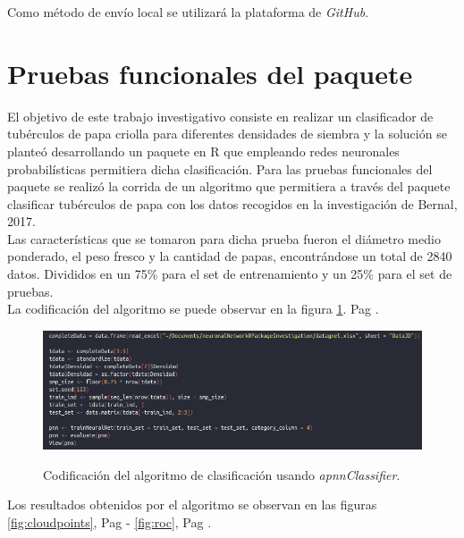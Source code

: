 	Como método de envío local se utilizará la plataforma de \textit{GitHub}.\\
	
\section{Pruebas funcionales del paquete}

	El objetivo de este trabajo investigativo consiste en realizar un clasificador de tubérculos de papa criolla para diferentes densidades de siembra y la solución se planteó desarrollando un paquete en R que empleando redes neuronales probabilísticas permitiera dicha clasificación. Para las pruebas funcionales del paquete se realizó la corrida de un algoritmo que permitiera a través del paquete clasificar tubérculos de papa con los datos recogidos en la investigación de Bernal, 2017. \\

	Las características que se tomaron para dicha prueba fueron el diámetro medio ponderado, el peso fresco y la cantidad de papas, encontrándose un total de 2840 datos. Divididos en un 75\% para el set de entrenamiento y un 25\% para el set de pruebas.\\

La codificación del algoritmo se puede observar en la figura \ref{fig:packageuse}. Pag \pageref{fig:packageuse}. \\

\begin{figure}[h]
	\caption{Codificación del algoritmo de clasificación usando \textit{apnnClassifier}.}
	\centering
	\includegraphics[scale=0.5]{packageuse.png}
	\label{fig:packageuse}
\end{figure}

Los resultados obtenidos por el algoritmo se observan en las figuras \ref{fig:cloudpoints}, Pag \pageref{fig:cloudpoints} - \ref{fig:roc}, Pag \pageref{fig:roc}. \\

